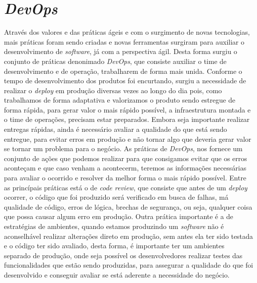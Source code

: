     \section{\textit{DevOps}}
      Através dos valores e das práticas ágeis e com o surgimento de novas
      tecnologias, mais práticas foram sendo criadas e novas ferramentas surgiram
      para auxiliar o desenvolvimento de \textit{software}, já com a perspectiva
      ágil. Desta forma surgiu o conjunto de práticas denonimado \textit{DevOps}, que
      consiste auxiliar o time de desenvolvimento e de operação, trabalharem de
      forma mais unida. Conforme o tempo de desenvolvimento dos produtos foi
      encurtando, surgiu a necessidade de realizar o \textit{deploy} em produção
      diversas vezes ao longo do dia pois, como trabalhamos de forma adaptativa
      e valorizamos o produto sendo estregue de forma rápida, para gerar valor
      o mais rápido possível, a infraestrutura montada e o time de operações,
      precisam estar preparados. Embora seja importante realizar entregas rápidas,
      ainda é necessário avaliar a qualidade do que está sendo entregue, para
      evitar erros em produção e não tornar algo que deveria gerar valor se
      tornar um problema para o negócio. \newline
      As práticas de \textit{DevOps}, nos fornece um conjunto de ações que podemos
      realizar para que consigamos evitar que os erros aconteçam e que caso venham
      a acontecerm, teremos as informações necessárias para avaliar o ocorrido e
      resolver da melhor forma o mais rápido possível. \newline
      Entre as princípais práticas está o de \textit{code review}, que consiste
      que antes de um \textit{deploy} ocorrer, o código que foi produzido será
      verificado em busca de falhas, má qualidade de código, erros de lógica,
      brechas de segurança, ou seja, qualquer coisa que possa causar algum erro
      em produção. Outra prática importante é a de estratégias de ambientes,
      quando estamos produzindo um \textit{software} não é aconselhável realizar
      alterações direto em produção, sem antes ela ter sido testada e o código
      ter sido avaliado, desta forma, é importante ter um ambientes separado de
      produção, onde seja possível os desenvolvedores realizar testes das
      funcionalidades que estão sendo produzidas, para assegurar a qualidade do
      que foi desenvolvido e conseguir avaliar se está aderente a necessidade do
      negócio. \newline
